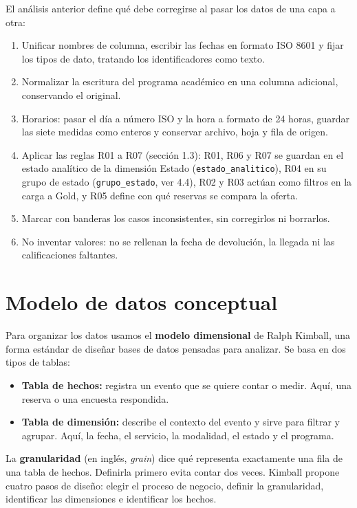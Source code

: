 \documentclass[11pt,letterpaper]{article}
\begin{document}
El análisis anterior define qué debe corregirse al pasar los datos de una capa a otra:

\begin{enumerate}[leftmargin=1.5em,itemsep=2pt]
\item Unificar nombres de columna, escribir las fechas en formato ISO 8601 y fijar los tipos de dato, tratando los identificadores como texto.
\item Normalizar la escritura del programa académico en una columna adicional, conservando el original.
\item Horarios: pasar el día a número ISO y la hora a formato de 24 horas, guardar las siete medidas como enteros y conservar archivo, hoja y fila de origen.
\item Aplicar las reglas R01 a R07 (sección 1.3): R01, R06 y R07 se guardan en el estado analítico de la dimensión Estado (\texttt{estado\_\allowbreak{}analitico}), R04 en su grupo de estado (\texttt{grupo\_\allowbreak{}estado}, ver 4.4), R02 y R03 actúan como filtros en la carga a Gold, y R05 define con qué reservas se compara la oferta.
\item Marcar con banderas los casos inconsistentes, sin corregirlos ni borrarlos.
\item No inventar valores: no se rellenan la fecha de devolución, la llegada ni las calificaciones faltantes.
\end{enumerate}


\section{Modelo de datos conceptual}

Para organizar los datos usamos el \textbf{modelo dimensional} de Ralph Kimball, una forma estándar de diseñar bases de datos pensadas para analizar. Se basa en dos tipos de tablas:

\begin{itemize}[leftmargin=1.5em,itemsep=2pt]
\item \textbf{Tabla de hechos:} registra un evento que se quiere contar o medir. Aquí, una reserva o una encuesta respondida.
\item \textbf{Tabla de dimensión:} describe el contexto del evento y sirve para filtrar y agrupar. Aquí, la fecha, el servicio, la modalidad, el estado y el programa.
\end{itemize}

La \textbf{granularidad} (en inglés, \emph{grain}) dice qué representa exactamente una fila de una tabla de hechos. Definirla primero evita contar dos veces. Kimball propone cuatro pasos de diseño: elegir el proceso de negocio, definir la granularidad, identificar las dimensiones e identificar los hechos.
\end{document}
